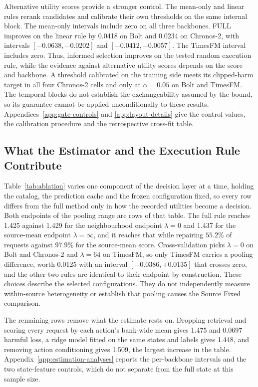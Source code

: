 \documentclass{article}
\begin{document}
Alternative utility scores provide a stronger control. The mean-only and linear rules
rerank candidates and calibrate their own thresholds on the same internal block.
The mean-only intervals include zero on all three backbones. FULL improves on the linear
rule by 0.0418 on Bolt and 0.0234 on Chronos-2, with intervals
$[-0.0638,-0.0202]$ and $[-0.0412,-0.0057]$. The TimesFM interval includes zero.
Thus, informed selection improves on the tested random execution rule, while the evidence against
alternative utility scores depends on the score and backbone.
A threshold calibrated on the training side meets its clipped-harm target in all four
Chronos-2 cells and only at $\alpha=0.05$ on Bolt and TimesFM. The temporal blocks do
not establish the exchangeability assumed by the bound, so its guarantee cannot be applied
unconditionally to these results.
Appendices~\ref{app:gate-controls} and \ref{app:layout-details} give the control values, the
calibration procedure and the retrospective cross-fit table.

\subsection{What the Estimator and the Execution Rule Contribute}
\label{sec:exp-ablation}
Table~\ref{tab:ablation} varies one component of the decision layer at a time, holding the
catalog, the prediction cache and the frozen configuration fixed, so every row differs from
the full method only in how the recorded utilities become a decision. Both endpoints of the
pooling range are rows of that table. The full rule reaches 1.425 against 1.429 for the
neighbourhood endpoint $\lambda=0$ and 1.437 for the source-mean endpoint
$\lambda=\infty$, and it reaches that while repairing $55.2\%$ of requests against $97.9\%$
for the source-mean score. Cross-validation picks $\lambda=0$ on Bolt and Chronos-2 and
$\lambda=64$ on TimesFM, so only TimesFM carries a pooling difference, worth 0.0125 with an
interval $[-0.0386,+0.0135]$ that crosses zero, and the other two rules are identical to
their endpoint by construction. These choices describe the selected configurations. They do not independently measure
within-source heterogeneity or establish that pooling causes the Source Fixed comparison.

The remaining rows remove what the estimate rests on. Dropping retrieval and scoring every
request by each action's bank-wide mean gives 1.475 and 0.0697 harmful loss, a ridge model
fitted on the same states and labels gives 1.448, and removing action conditioning gives
1.509, the largest increase in the table. Appendix~\ref{app:estimation-analyses} reports the
per-backbone intervals and the two state-feature controls, which do not separate from the
full state at this sample size.
\end{document}
